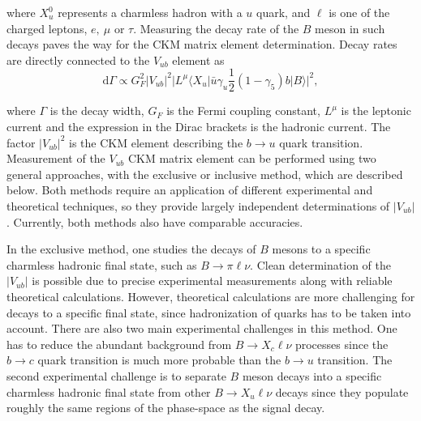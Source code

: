 where $X_u^0$ represents a charmless hadron with a $u$ quark, and $\ell$ is one of the charged leptons, $e,~\mu$ or $\tau$. Measuring the decay rate of the $B$ meson in such decays paves the way for the CKM matrix element determination. Decay rates are directly connected to the $V_{ub}$ element as
\begin{equation}
\mathrm{d} \Gamma \propto G_F^2 \vert V_{ub} \vert ^2 \vert L^\mu \langle X_u \vert \bar u \gamma_u \frac{1}{2} (1-\gamma_5) b \vert B \rangle \vert ^2,
\end{equation}

where $\Gamma$ is the decay width, $G_F$ is the Fermi coupling constant, $L^\mu$ is the leptonic current and the expression in the Dirac brackets is the hadronic current. The factor $\vert V_{ub} \vert ^2$ is the CKM element describing the $b \to u$ quark transition. Measurement of the $V_{ub}$ CKM matrix element can be performed using two general approaches, with the exclusive or inclusive method, which are described below. Both methods require an application of different experimental and theoretical techniques, so they provide largely independent determinations of $\vert V_{ub} \vert$. Currently, both methods also have comparable accuracies. 

In the exclusive method, one studies the decays of $B$ mesons to a specific charmless hadronic final state, such as $B \to \pi \ell \nu$. Clean determination of the $\vert V_{ub}\vert$ is possible due to precise experimental measurements along with reliable theoretical calculations. However, theoretical calculations are more challenging for decays to a specific final state, since hadronization of quarks has to be taken into account. There are also two main experimental challenges in this method. One has to reduce the abundant background from $B \to X_c \ell \nu$ processes since the $b \to c$ quark transition is much more probable than the $b \to u$ transition. The second experimental challenge is to separate $B$ meson decays into a specific charmless hadronic final state from other $B \to X_u \ell \nu$ decays since they populate roughly the same regions of the phase-space as the signal decay.

